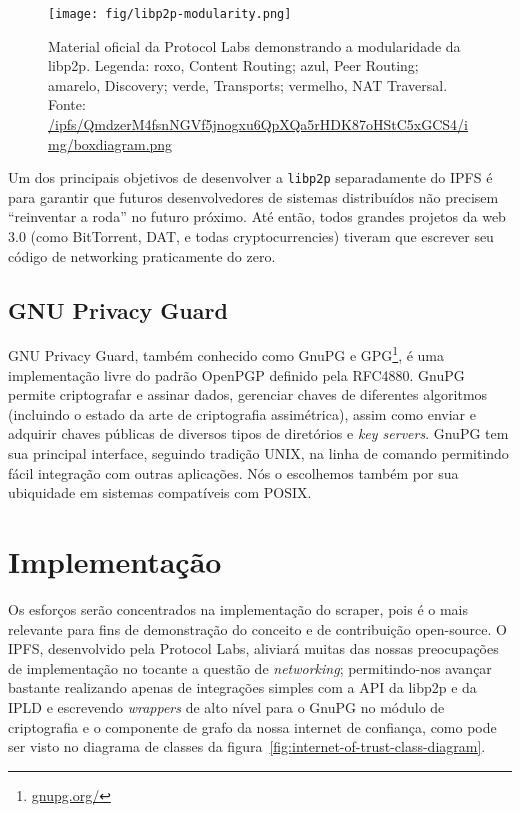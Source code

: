 \begin{figure}[htbp]
    \centering
    \texttt{[image: fig/libp2p-modularity.png]}
    \caption[IPFS's libp2p: a modular network stack]{
        Material oficial da Protocol Labs demonstrando a modularidade da libp2p.
        Legenda: roxo, Content Routing; azul, Peer Routing; amarelo, Discovery; verde, Transports; vermelho, NAT Traversal.\\
        Fonte: \url{/ipfs/QmdzerM4fsnNGVf5jnogxu6QpXQa5rHDK87oHStC5xGCS4/img/boxdiagram.png}
    }
    \label{fig:libp2p-modularity}
\end{figure}

Um dos principais objetivos de desenvolver a \texttt{libp2p} separadamente do IPFS é para garantir que futuros desenvolvedores de sistemas distribuídos não precisem ``reinventar a roda'' no futuro próximo.
Até então, todos grandes projetos da web 3.0 (como BitTorrent, DAT, e todas cryptocurrencies) tiveram que escrever seu código de networking praticamente do zero.

\subsection{GNU Privacy Guard}

GNU Privacy Guard, também conhecido como GnuPG e GPG\footnote{\url{gnupg.org/}}, é uma implementação livre do padrão OpenPGP definido pela RFC4880.
GnuPG permite criptografar e assinar dados, gerenciar chaves de diferentes algoritmos (incluindo o estado da arte de criptografia assimétrica), assim como enviar e adquirir chaves públicas de diversos tipos de diretórios e \textit{key servers}.
GnuPG tem sua principal interface, seguindo tradição UNIX, na linha de comando permitindo fácil integração com outras aplicações.
Nós o escolhemos também por sua ubiquidade em sistemas compatíveis com POSIX.

\section{Implementação}

Os esforços serão concentrados na implementação do scraper, pois é o mais relevante para fins de demonstração do conceito e de contribuição open-source.
O IPFS, desenvolvido pela Protocol Labs, aliviará muitas das nossas preocupações de implementação no tocante a questão de \textit{networking}; permitindo-nos avançar bastante realizando apenas de integrações simples com a API da libp2p e da IPLD e escrevendo \textit{wrappers} de alto nível para o GnuPG no módulo de criptografia e o componente de grafo da nossa internet de confiança, como pode ser visto no diagrama de classes da figura~\ref{fig:internet-of-trust-class-diagram}.

